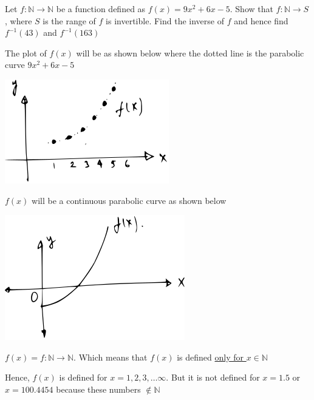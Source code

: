 \documentclass[14pt,fleqn]{extarticle}
\newcommand\N{\mathbb{N}}
\newcommand\fx{9x^2+6x-5}
\begin{document}
 
\begin{problem}
	\statement 

Let $f:\N\to\N$ be a function defined as $f(x) = \fx$. Show that 
$f:\N\to S$, where $S$ is the range of $f$ is invertible. Find the 
inverse of $f$ and hence find $f^{-1}(43)$ and $f^{-1}(163)$ 
      
      \begin{step}
  \begin{options} 
     \correct 
       
       The plot of $f(x)$ will be as shown below where the dotted line 
       is the parabolic curve $\fx$ 
       
       \begin{center}
\includegraphics[scale=1.5]{1427-C.svg}
\end{center}
       
     \incorrect
     
     $f(x)$ will be a continuous parabolic curve as shown below 
     
     \begin{center}
\includegraphics[scale=1.5]{1427-A.svg}
\end{center}
        
    \end{options} 
     \reason 
     
     $f(x) = f:\N\to\N$. Which means that $f(x)$ is defined \underline{only for $x\in\N$}\newline 
     
     Hence, $f(x)$ is defined for $x=1,2,3,\ldots\infty$. But it is not defined for $x=1.5$ or $x=100.4454$ because these numbers $\notin\N$\newline 
     

\end{step}
\end{problem}
\end{document}
